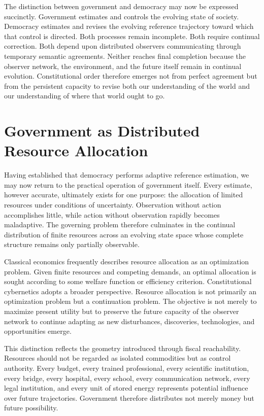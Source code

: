\documentclass[12pt,a4paper]{article}
\begin{document}
The distinction between government and democracy may now be expressed succinctly. Government estimates and controls the evolving state of society. Democracy estimates and revises the evolving reference trajectory toward which that control is directed. Both processes remain incomplete. Both require continual correction. Both depend upon distributed observers communicating through temporary semantic agreements. Neither reaches final completion because the observer network, the environment, and the future itself remain in continual evolution. Constitutional order therefore emerges not from perfect agreement but from the persistent capacity to revise both our understanding of the world and our understanding of where that world ought to go.

\section{Government as Distributed Resource Allocation}

Having established that democracy performs adaptive reference estimation, we may now return to the practical operation of government itself. Every estimate, however accurate, ultimately exists for one purpose: the allocation of limited resources under conditions of uncertainty. Observation without action accomplishes little, while action without observation rapidly becomes maladaptive. The governing problem therefore culminates in the continual distribution of finite resources across an evolving state space whose complete structure remains only partially observable.

Classical economics frequently describes resource allocation as an optimization problem. Given finite resources and competing demands, an optimal allocation is sought according to some welfare function or efficiency criterion. Constitutional cybernetics adopts a broader perspective. Resource allocation is not primarily an optimization problem but a continuation problem. The objective is not merely to maximize present utility but to preserve the future capacity of the observer network to continue adapting as new disturbances, discoveries, technologies, and opportunities emerge.

This distinction reflects the geometry introduced through fiscal reachability. Resources should not be regarded as isolated commodities but as control authority. Every budget, every trained professional, every scientific institution, every bridge, every hospital, every school, every communication network, every legal institution, and every unit of stored energy represents potential influence over future trajectories. Government therefore distributes not merely money but future possibility.
\end{document}
